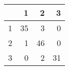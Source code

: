 \begin{tabular}{rrrr}
  \hline
 & 1 & 2 & 3 \\ 
  \hline
1 &  35 &   3 &   0 \\ 
  2 &   1 &  46 &   0 \\ 
  3 &   0 &   2 &  31 \\ 
   \hline
\end{tabular}
